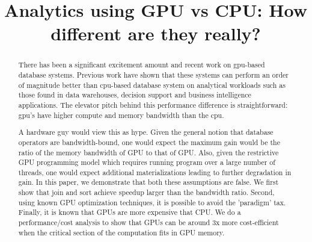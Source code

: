 \documentclass[sigconf]{acmart}
\begin{document}
\title{Analytics using GPU vs CPU: How different are they really?}

\begin{abstract}
There has been a significant excitement amount and recent work on gpu-based
database systems. Previous work have shown that these systems can perform an
order of magnitude better than cpu-based database system on analytical
workloads such as those found in data warehouses, decision support and business
intelligence applications. The elevator pitch behind this performance
difference is straightforward: gpu's have higher compute and memory bandwidth
than the cpu. 

A hardware guy would view this as hype. Given the general notion that database
operators are bandwidth-bound, one would expect the maximum gain would be the
ratio of the memory bandwidth of GPU to that of GPU. Also, given the
restrictive GPU programming model which requires running program over a large
number of threads, one would expect additional materializations leading to
further degradation in gain. In this paper, we demonstrate that both these
assumptions are false. We first show that join and sort achieve speedup larger
than the bandwidth ratio. Second, using known GPU optimization techniques, it
is possible to avoid the 'paradigm' tax. Finally, it is known that GPUs are
more expensive that CPU. We do a performance/cost analysis to show that GPUs
can be around 3x more cost-efficient when the critical section of the
computation fits in GPU memory.
\end{abstract}

\maketitle




%

{

}


\end{document}
